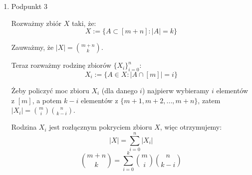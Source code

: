\documentclass{mwart}
\begin{document}
\begin{mdframed}
\begin{enumerate}
              Dla $x_1 \neq x_2$ wybieramy $x_1$ na $n$ sposobów, $x_2$ na $n-1$ sposobów, a potem dobieramy resztę elementów z $A$,
              dostajemy $n(n-1)2^{n-2}$.
              Zatem mamy:
              \[|X| = n2^{n-1} + n(n-1)2^{n-2} = (2n + n^2 - n)2^{n-2} = (n + n^2)2^{n-2}\]

              Teraz rozważmy rodzinę zbiorów $\{X_k\}_{k=0}^n$:
              \[X_k := \{(A, x_1, x_2) \in X : |A| = k\}\]

              Żeby policzyć moc zbioru $X_k$ (dla danego $k$) najpierw wybierzemy $k$-elementowy zbiór $A \subset [n]$, a potem wybierzemy z niego elementy
              $x_1$ i $x_2$ (przy czym mogą być one sobie równe):
              \[|X_k| = {n \choose k} \cdot k\cdot k\]

              Rodzina $X_k$ jest rozłącznym pokryciem zbioru $X$, więc otrzymujemy:
              \[\sum_{k=0}^{n} |X_k| = |X|\]
              \[\sum_{k=0}^{n}k^2{n \choose k}= n(n+1)2^{n-2}\]

        \item Podpunkt 3

              Rozważmy zbiór $X$ taki, że:
              \[X := \{A \subset [m + n] : |A| = k\}\]

              Zauważmy, że $|X| = {m+n \choose k}$.

              Teraz rozważmy rodzinę zbiorów $\{X_i\}_{i=0}^n$:
              \[X_i := \{A \in X : |A \cap [m]| = i\}\]

              Żeby policzyć moc zbioru $X_i$ (dla danego $i$) najpierw wybieramy $i$ elementów z $[m]$, a potem $k-i$ elementów z
              $\{m+1, m+2, ..., m+n\}$, zatem $|X_i| = {m \choose i}{n \choose k-i}$.

              Rodzina $X_i$ jest rozłącznym pokryciem zbioru $X$, więc otrzymujemy:
              \[|X| = \sum_{i=0}^{n} |X_i|\]
              \[{m+n \choose k} = \sum_{i=0}^{k}{m \choose i}{n \choose k-i}\]

    \end{enumerate}
\end{mdframed}
\end{document}
